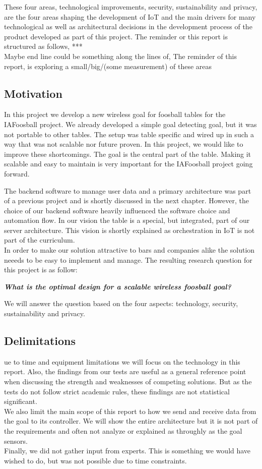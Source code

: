 These four areas, technological improvements, security, sustainability and privacy, are the four areas shaping the development of IoT and the main drivers for many technological as well as architectural decisions in the development process of the product developed as part of this project. The reminder or this report is structured as follows, ***\\
Maybe end line could be something along the lines of, The reminder of this report, is exploring a small/big/(some measurement) of these areas 

\subsection{Motivation}
In this project we develop a new wireless goal for foosball tables for the IAFoosball project. We already developed a simple goal detecting goal, but it was not portable to other tables. The setup was table specific and wired up in such a way that was not scalable nor future proven. In this project, we would like to improve these shortcomings. The goal is the central part of the table. Making  it scalable and easy to maintain is very important for the IAFoosball project going forward. 

The backend software to manage user data and a primary architecture was part of a previous project and is shortly discussed in the next chapter. However, the choice of our backend software heavily influenced the software choice and automation flow. 
In our vision the table is a special, but integrated, part of our server architecture. This vision is shortly explained as orchestration in IoT is not part of the curriculum.\\

In order to make our solution attractive to bars and companies alike the solution neeeds to be easy to implement and manage. The resulting research question for this project is as follow:
\begin{center}
    \textbf{\textit{What is the optimal design for a scalable wireless foosball goal?}}
\end{center}
We will answer the question based on the four aspects: technology, security, sustainability and privacy. 

\subsection{Delimitations}
ue to time and equipment limitations we will focus on the technology in this report. Also, the findings from our tests are useful as a general reference point when discussing the strength and weaknesses of competing solutions. But as the tests do not follow strict academic rules, these findings are not statistical significant. \\
We also limit the main scope of this report to how we send and receive data from the goal to its controller. We will show the entire architecture but it is not part of the requirements and often not analyze or explained as throughly as the goal sensors.\\
Finally, we did not gather input from experts. This is something we would have wished to do, but was not possible due to time constraints.